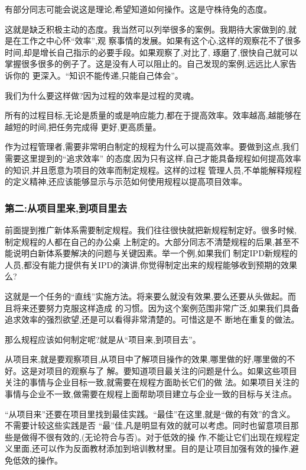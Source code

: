 \documentclass[11pt]{article}
\begin{document}
有部分同志可能会说这是理论,希望知道如何操作。这是守株待兔的态度。

这就是缺乏积极主动的态度。我当然可以列举很多的案例。我期待大家做到的,就是在工作之中心怀``效率'',观
察事情的发展。如果有这个心,这样的观察花不了很多时间,却是增长自己指示的必要手段。如果观察了,对比了,
琢磨了,很快自己就可以掌握很多很多的例子了。这是没有人可以阻止的。自己发现的案例,远远比人家告诉你的
更深入。``知识不能传递,只能自己体会''。

我们为什么要这样做?因为过程的效率是过程的灵魂。

所有的过程目标,无论是质量的或是响应能力,都在于提高效率。效率越高,越能够在越短的时间,把任务完成得
更好,更高质量。

作为过程管理者,需要非常明白制定的规程为什么可以提高效率。要做到这点,我们需要这里提到的``追求效率''
的态度,因为只有这样,自己才能具备规程如何提高效率的知识,并且愿意为项目的效率而制定规程。这样的过程
管理人员,不单能解释规程的定义精神,还应该能够显示与示范如何使用规程以提高项目效率。

\subsubsection{第二:从项目里来,到项目里去}

前面提到推广新体系需要制定规程。我们往往很快就把新规程制定好。很多时候,制定规程的人都在自己的办公桌
上制定的。大部分同志不清楚规程的后果,甚至不能说明白新体系要解决的问题与关键因素。举一个例,如果我们
制定IPD新规程的人员,都没有能力提供有关IPD的演讲,你觉得制定出来的规程能够收到预期的效果么?

这就是一个任务的``直线''实施方法。将来要么就没有效果,要么还要从头做起。而且将来还要努力克服这样造成
的习惯。因为这个案例范围非常广泛,如果我们具备追求效率的强烈欲望,还是可以看得非常清楚的。可惜这是不
断地在重复的做法。

那么规程应该如何制定呢?就是从``项目来,到项目去''。

从项目来,就是要观察项目,从项目中了解项目操作的效果,哪里做的好,哪里做的不好。这是对项目的观察与了
解。要知道项目最关注的问题是什么。如果这些项目关注的事情与企业目标一致,就需要在规程方面助长它们的做
法。如果项目关注的事情与企业不一致,做需要在规程上面帮助项目建立与企业一致的目标与关注点。

``从项目来''还要在项目里找到最佳实践。``最佳''在这里,就是``做的有效''的含义。不需要计较这些实践是否
``最''佳,凡是明显有效的就可以考虑。同时也留意项目那些是做得不很有效的,(无论符合与否)。对于低效的操
作,不能让它们出现在规程定义里面,还可以作为反面教材添加到培训教材里。目的是让项目加强有效的操作,避
免低效的操作。
\end{document}
